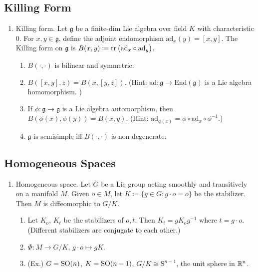 \subsection{Killing Form}
\begin{enumerate}
    \item Killing form. Let $\mathfrak{g}$ be a finite-dim Lie algebra over field $K$ with characteristic $0$. For $x,y
    \in \mathfrak{g}$, define the adjoint endomorphism $\text{ad}_x(y) = [x,y]$. The Killing form on $\mathfrak{g}$ is $B(x,y) \coloneqq \operatorname{tr}\big( \text{ad}_x \circ \text{ad}_y \big)$.
        \begin{enumerate}
            \item $B(\cdot,\cdot)$ is bilinear and symmetric.
            \item $B([x,y],z)=B(x,[y,z])$. (Hint: $\text{ad}: \mathfrak{g} \to \text{End}(\mathfrak{g})$ is a Lie algebra homomorphism. \cite[Proposition~3.8]{Hall_2015_lie})
            \item If $\phi:\mathfrak{g} \to \mathfrak{g}$ is a Lie algebra automorphism, then $B(\phi(x),\phi(y))=B(x,y)$. (Hint: $\text{ad}_{\phi(x)}=\phi \circ \text{ad}_x \circ \phi^{-1}$.)
            \item $\mathfrak{g}$ is semisimple iff $B(\cdot,\cdot)$ is non-degenerate.
        \end{enumerate}
\end{enumerate}

\subsection{Homogeneous Spaces}
\label{sec:homogeneous-spaces}
\begin{enumerate}
    \item Homogeneous space. Let $G$ be a Lie group acting smoothly and transitively on a manifold $M$. Given $o\in M$, let $K \coloneqq \{g \in G: g\cdot o=o\}$ be the stabilizer. Then $M$ is diffeomorphic to $G/K$.
        \begin{enumerate}
            \item Let $K_o$, $K_t$ be the stabilizers of $o,t$. Then $K_t = g K_o g^{-1}$ where $t=g\cdot o$. (Different stabilizers are conjugate to each other.)
            \item $\Phi: M \to G/K$, $g \cdot o \mapsto gK$.
            \item (Ex.) $G=\operatorname{SO}(n)$, $K=\operatorname{SO}(n-1)$, $G/K \cong \mathrm{S}^{n-1}$, the unit sphere in $\mathbb{R}^n$.
        \end{enumerate}
\end{enumerate}

